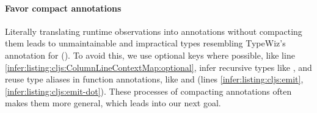 \begin{figure}
\end{figure}



\paragraph{Favor compact annotations}
Literally translating runtime observations into
annotations without compacting them
leads to unmaintainable and impractical types resembling
TypeWiz's annotation for  ().
To avoid this, we
  use optional keys where possible, like line \ref{infer:listing:cljs:ColumnLineContextMap:optional},
  infer recursive types like , and
  reuse type aliases in function annotations, like
     and  (lines \ref{infer:listing:cljs:emit}, \ref{infer:listing:cljs:emit-dot}).
These processes of compacting annotations often makes them more general,
which leads into our next goal.


